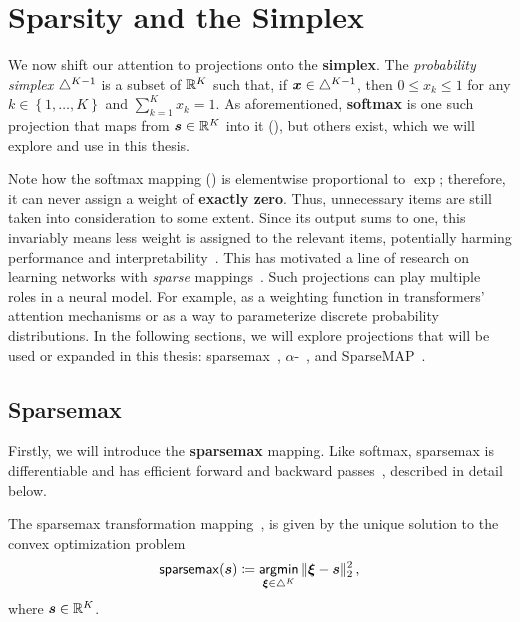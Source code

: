 \section{Sparsity and the Simplex}
\label{sec:sparsity_background}

\noindent We now shift our attention to projections onto the
\textbf{simplex}. The \textit{probability simplex} $\triangle^{K-1}$
is a subset of $\mathbb{R}^K$ such that, if $\bm{x}\in\triangle^{K-1}$,
then $0 \leq x_k \leq 1$ for any $k\in\left\{1, \dots, K\right\}$ and
$\sum_{k=1}^K x_k = 1$. As aforementioned, \textbf{softmax} is one
such projection that maps from $\bm{s}\in\mathbb{R}^K$ into it
(), but others exist, which we will explore and
use in this thesis.

Note how the softmax mapping () is elementwise
proportional to $\exp$; therefore, it can never assign a weight of
\textbf{exactly zero}. Thus, unnecessary items are still taken into
consideration to some extent. Since its output sums to one, this
invariably means less weight is assigned to the relevant items,
potentially harming performance and
interpretability~\citep{jain2019attention}. This has motivated a line
of research on learning networks with \emph{sparse}
mappings~\citep{sparsemax,fusedmax,louizos,shao2019ssn}.
Such projections can play multiple roles in a neural model.
For example, as a weighting function in transformers' attention mechanisms
or as a way to parameterize discrete probability distributions.
In the following
sections, we will explore projections that will be used or expanded in
this thesis: sparsemax~\citep{sparsemax},
$\alpha$-\entmaxtext~\citep{blondel2019learning,entmax}, and
SparseMAP~\cite{sparsemap}.

\subsection{Sparsemax}\label{sec:sparsemax_bg}

\noindent Firstly, we will introduce the \textbf{sparsemax} mapping.
Like softmax, sparsemax is differentiable and has efficient forward and backward
passes~\citep{Held1974,sparsemax}, described in detail below.

\begin{definition}[sparsemax]
    The sparsemax transformation
    mapping~\citep{sparsemax}, is given by the unique solution
    to the convex optimization problem
    \begin{equation}\label{eq:sparsemax}
        \operatorname*{\mathsf{sparsemax}}(\bm{s}) \coloneqq \operatorname*{\mathsf{argmin}}_{\bm{\xi} \in \triangle^K} \| \bm{\xi} - \bm{s} \|_2^2\,,
    \end{equation}
    where $\bm{s}\in\mathbb{R}^K$.
\end{definition}


